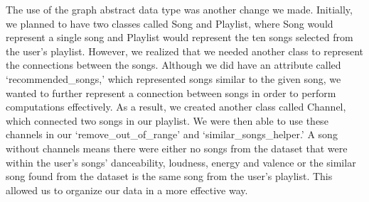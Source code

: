 \documentclass[fontsize=11pt]{article}
\begin{document}
\begin{enumerate}
The use of the graph abstract data type was another change we made. Initially, we planned to have two classes called Song and Playlist, where Song would represent a single song and Playlist would represent the ten songs selected from the user's playlist. However, we realized that we needed another class to represent the connections between the songs. Although we did have an attribute called ‘recommended\_songs,’ which represented songs similar to the given song, we wanted to further represent a connection between songs in order to perform computations effectively. As a result, we created another class called Channel, which connected two songs in our playlist. We were then able to use these channels in our ‘remove\_out\_of\_range’ and ‘similar\_songs\_helper.’ A song without channels means there were either no songs from the dataset that were within the user’s songs’ danceability, loudness, energy and valence or the similar song found from the dataset is the same song from the user’s playlist. This allowed us to organize our data in a more effective way. 


\end{enumerate}
\end{document}
